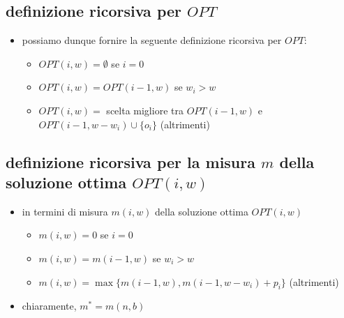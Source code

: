 \subsection*{definizione ricorsiva per $OPT$}
\begin{flushleft}
	\begin{itemize}
		\item possiamo dunque fornire la seguente definizione ricorsiva per $OPT$:
		\begin{itemize}
			\item $OPT(i,w)=\emptyset$ se $i=0$
			\item $OPT(i,w)=OPT(i-1,w)$ se $w_i>w$
			\item $OPT(i,w)=$ scelta migliore tra $OPT(i-1,w)$ e $OPT(i-1,w-w_i)\cup\{o_i\}$ (altrimenti)
		\end{itemize}
	\end{itemize}
\end{flushleft}


\subsection*{definizione ricorsiva per la misura $m$ della soluzione ottima $OPT(i,w)$}
\begin{flushleft}
	\begin{itemize}
		\item in termini di misura $m(i,w)$ della soluzione ottima $OPT(i,w)$
		\begin{itemize}
			\item $m(i,w)=0$ se $i=0$
			\item $m(i,w)=m(i-1,w)$ se $w_i>w$
			\item $m(i,w)=\max\{m(i-1,w),m(i-1,w-w_i)+p_i\}$ (altrimenti)
		\end{itemize}
		\item chiaramente, $m^*=m(n,b)$
	\end{itemize}
\end{flushleft}


